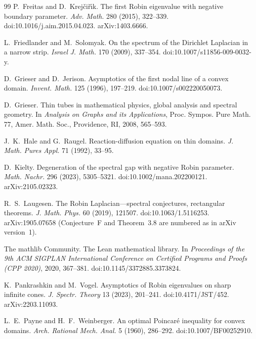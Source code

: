 \documentclass[11pt,a4paper]{article}
\numberwithin{equation}{section}
\theoremstyle{paperplain}
\theoremstyle{remark}
\begin{document}
\begin{thebibliography}{99}
P.~Freitas and D.~Krej\v{c}i\v{r}\'{\i}k.
\newblock The first {R}obin eigenvalue with negative boundary parameter.
\newblock \emph{Adv. Math.} 280 (2015), 322--339.
\newblock doi:10.1016/j.aim.2015.04.023. arXiv:1403.6666.

L.~Friedlander and M.~Solomyak.
\newblock On the spectrum of the {D}irichlet {L}aplacian in a narrow strip.
\newblock \emph{Israel J. Math.} 170 (2009), 337--354.
\newblock doi:10.1007/s11856-009-0032-y.

D.~Grieser and D.~Jerison.
\newblock Asymptotics of the first nodal line of a convex domain.
\newblock \emph{Invent. Math.} 125 (1996), 197--219.
\newblock doi:10.1007/s002220050073.

D.~Grieser.
\newblock Thin tubes in mathematical physics, global analysis and spectral
  geometry.
\newblock In \emph{Analysis on Graphs and its Applications}, Proc. Sympos.
  Pure Math. 77, Amer. Math. Soc., Providence, RI, 2008, 565--593.

J.~K.~Hale and G.~Raugel.
\newblock Reaction-diffusion equation on thin domains.
\newblock \emph{J. Math. Pures Appl.} 71 (1992), 33--95.

D.~Kielty.
\newblock Degeneration of the spectral gap with negative {R}obin parameter.
\newblock \emph{Math. Nachr.} 296 (2023), 5305--5321.
\newblock doi:10.1002/mana.202200121. arXiv:2105.02323.

R.~S.~Laugesen.
\newblock The {R}obin {L}aplacian---spectral conjectures, rectangular
  theorems.
\newblock \emph{J. Math. Phys.} 60 (2019), 121507.
\newblock doi:10.1063/1.5116253. arXiv:1905.07658 (Conjecture~F and
  Theorem~3.8 are numbered as in arXiv version~1).

The mathlib Community.
\newblock The {L}ean mathematical library.
\newblock In \emph{Proceedings of the 9th ACM SIGPLAN International
  Conference on Certified Programs and Proofs (CPP 2020)}, 2020, 367--381.
\newblock doi:10.1145/3372885.3373824.

K.~Pankrashkin and M.~Vogel.
\newblock Asymptotics of {R}obin eigenvalues on sharp infinite cones.
\newblock \emph{J. Spectr. Theory} 13 (2023), 201--241.
\newblock doi:10.4171/JST/452. arXiv:2203.11093.

L.~E.~Payne and H.~F.~Weinberger.
\newblock An optimal {P}oincar\'e inequality for convex domains.
\newblock \emph{Arch. Rational Mech. Anal.} 5 (1960), 286--292.
\newblock doi:10.1007/BF00252910.


\end{thebibliography}
\end{document}
